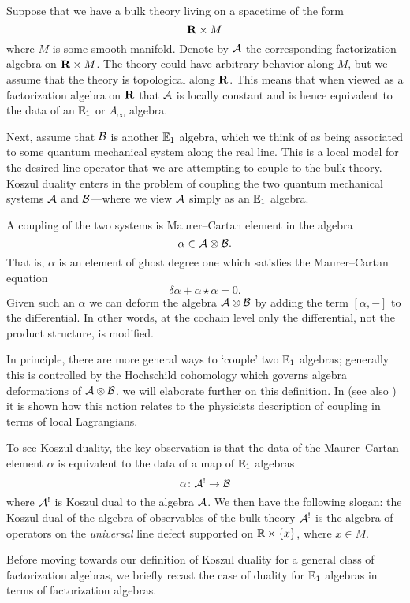 \documentclass[11pt]{amsart}
\begin{document}
\parsec[s:lines]
Suppose that we have a bulk theory living on a spacetime of the form 
\[
\mathbf{R} \times M 
\]
where $M$ is some smooth manifold. 
Denote by $\mathcal A$ the corresponding factorization algebra on $\mathbf{R} \times M$. 
The theory could have arbitrary behavior along $M$, but we assume that the theory is topological along $\mathbf{R}$. 
This means that when viewed as a factorization algebra on $\mathbf{R}$ that $\mathcal A$ is locally constant and is hence equivalent to the data of an $\mathbb E_1$ or $A_\infty$ algebra.

Next, assume that $\mathcal B$ is another $\mathbb E_1$ algebra, which we think of as being associated to some quantum mechanical system along the real line.
This is a local model for the desired line operator that we are attempting to couple to the bulk theory.
Koszul duality enters in the problem of coupling the two quantum mechanical systems $\mathcal A$ and $\mathcal B$---where we view $\mathcal A$ simply as an $\mathbb E_1$ algebra. 

A coupling of the two systems is Maurer--Cartan element in the algebra
\[
\alpha \in \mathcal A \otimes \mathcal B .
\]
That is, $\alpha$ is an element of ghost degree one which satisfies the Maurer--Cartan equation
\[
\delta \alpha + \alpha \star \alpha = 0 .
\]
Given such an $\alpha$ we can deform the algebra $\mathcal A \otimes \mathcal B$ by adding the term $[\alpha,-]$ to the differential. 
In other words, at the cochain level only the differential, not the product structure, is modified. 

In principle, there are more general ways to `couple' two $\mathbb E_1$ algebras; generally this is controlled by the Hochschild cohomology which governs algebra deformations of $\mathcal A \otimes \mathcal B$. 
we will elaborate further on this definition. 
In \cite{CG1} (see also \cite{PWkoszul}) it is shown how this notion relates to the physicists description of coupling in terms of local Lagrangians.

To see Koszul duality, the key observation is that the data of the Maurer--Cartan element $\alpha$ is equivalent to the data of a map of $\mathbb E_1$ algebras
\[
\alpha \colon \mathcal A^! \to \mathcal B 
\]
where $\mathcal A^!$ is Koszul dual to the algebra $\mathcal A$. 
We then have the following slogan: the Koszul dual of the algebra of observables of the bulk theory $\mathcal A^!$ is the algebra of operators on the {\em universal} line defect supported on $\mathbb R \times \{x\}$, where $x \in M$.  

\parsec[s:celine]

Before moving towards our definition of Koszul duality for a general class of factorization algebras, we briefly recast the case of duality for $\mathbb E_1$ algebras in terms of factorization algebras. 
\end{document}
